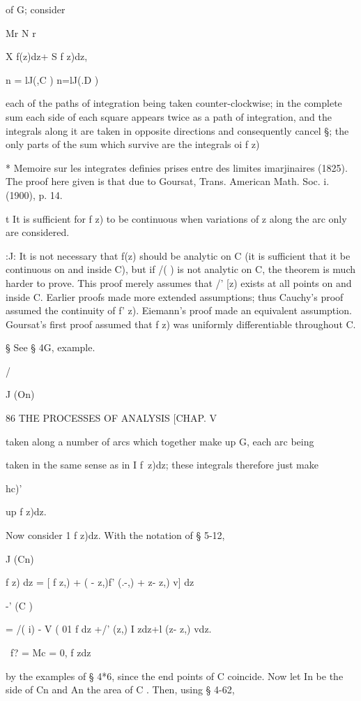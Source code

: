 of G; consider

Mr N r

X f(z)dz+ S f z)dz,

n = lJ(,C ) n=lJ(.D )

each of the paths of integration being taken counter-clockwise; in
the complete sum each side of each square appears twice as a path of
integration, and the integrals along it are taken in opposite
directions and consequently cancel §; the only parts of the sum which
survive are the integrals oi f z)

* Memoire sur les integrates definies prises entre des limites
imarjinaires (1825). The proof here given is that due to Goursat,
Trans. American Math. Soc. i. (1900), p. 14.

t It is sufficient for f z) to be continuous when variations of z
along the arc only are considered.

:J: It is not necessary that f(z) should be analytic on C (it is
sufficient that it be continuous on and inside C), but if /( ) is not
analytic on C, the theorem is much harder to prove. This proof merely
assumes that /' [z) exists at all points on and inside C. Earlier
proofs made more extended assumptions; thus Cauchy's proof assumed the
continuity of f' z). Eiemann's proof made an equivalent assumption.
Goursat's first proof assumed that f z) was uniformly differentiable
throughout C.

§ See § 4G, example.

/

J (On)

86 THE PROCESSES OF ANALYSIS [CHAP. V

taken along a number of arcs which together make up G, each arc being

taken in the same sense as in I f\ z)dz; these integrals therefore
just make

hc)'

up f z)dz.

Now consider 1 f z)dz. With the notation of § 5-12,

J (Cn)

f z) dz = [ f z,) + ( - z,)f' (.-,) + z- z,) v] dz

-' (C )

= /( i) - V ( 01 f dz +/' (z,) I zdz+l (z- z,) vdz.

\ f? = Mc = 0, f zdz

by the examples of § 4*6, since the end points of C coincide. Now let
In be the side of Cn and An the area of C . Then, using § 4-62,

